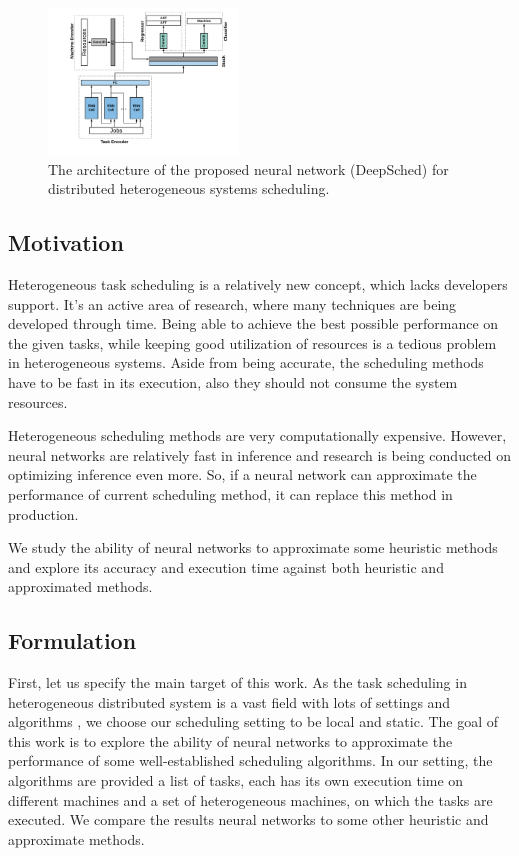 \begin{figure}[hp]
    \centering
    \includegraphics[width=0.45\textwidth]{diagrams/sched_nn}
    \caption{The architecture of the proposed neural network (DeepSched) for distributed heterogeneous systems scheduling.}
    \label{fig:nn}
\end{figure}

\subsection{Motivation}
Heterogeneous task scheduling is a relatively new concept, which lacks developers support. It's an active area of research, where many techniques are being developed through time. Being able to achieve the best possible performance on the given tasks, while keeping good utilization of resources is a tedious problem in heterogeneous systems. Aside from being accurate, the scheduling methods have to be fast in its execution, also they should not consume the system resources. 

Heterogeneous scheduling methods are very computationally expensive. However, neural networks are relatively fast in inference and research is being conducted on optimizing inference even more. So, if a neural network can approximate the performance of current scheduling method, it can replace this method in production. 

We study the ability of neural networks to approximate some heuristic methods and explore its accuracy and execution time against both heuristic and approximated methods.

\subsection{Formulation}
First, let us specify the main target of this work. As the task scheduling in heterogeneous distributed system is a vast field with lots of settings and algorithms \cite{inbook}, we choose our scheduling setting to be local and static. The goal of this work is to explore the ability of neural networks to approximate the performance of some well-established scheduling algorithms. In our setting, the algorithms are provided a list of tasks, each has its own execution time on different machines and a set of heterogeneous machines, on which the tasks are executed. We compare the results neural networks to some other heuristic and approximate methods.

